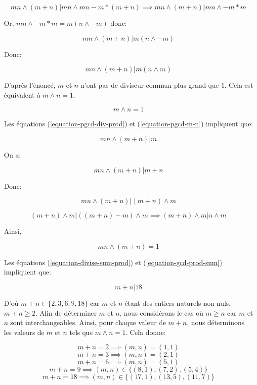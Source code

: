 \documentclass[12pt,a4paper,article]{memoir}
\begin{document}
\[mn \land (m + n)  | mn \land mn - m*(m + n) \implies mn \land (m + n)  | mn \land - m*m\]

Or, $mn \land - m*m = m(n \land - m)$ donc:

\[mn \land (m + n)  | m(n \land - m)\]

Donc:

\begin{equation}
mn \land (m + n)  | m(n \land m)
\label{equation-pgcd-div-prod}
\end{equation}

D'après l'énoncé, $m$ et $n$ n'ont pas de diviseur commun plus grand que 1. Cela est équivalent à $m \land n = 1$.

\begin{equation}
m \land n = 1
\label{equation-pgcd-m-n}
\end{equation}

Les équations (\ref{equation-pgcd-div-prod}) et (\ref{equation-pgcd-m-n}) impliquent que:

\begin{equation}
mn \land (m + n)  | m
\label{equation-divise-sum-prod-pgcd}
\end{equation}

On a:

\[mn \land (m + n)  | m + n \]

Donc:

\[mn \land (m + n)  | (m + n) \land m \]

\[(m + n) \land m | ((m + n) - m) \land m \implies (m + n) \land m | n \land m\]

Ainsi, 

\begin{equation}
mn \land (m + n)  = 1
\label{equation-gcd-prod-sum}
\end{equation}

Les équations (\ref{equation-divise-sum-prod}) et (\ref{equation-gcd-prod-sum}) impliquent que:

\begin{equation}
m+n | 18
\label{equation-sum-div-18}
\end{equation}

D'où $m + n \in \{2, 3, 6, 9, 18\}$ car $m$ et $n$ étant des entiers naturels non nuls, $m + n \geq 2$. Afin de déterminer $m$ et $n$, nous considérons le cas où $m \geq n$ car $m$ et $n$ sont interchangeables. Ainsi, pour chaque valeur de $m+n$, nous déterminons les valeurs de $m$ et $n$ tels que $m \land n = 1$.
Cela donne:

\[m + n = 2 \implies (m, n) = (1, 1)\]
\[m + n = 3 \implies (m, n) = (2, 1)\]
\[m + n = 6 \implies (m, n) = (5, 1)\]
\[m + n = 9 \implies (m, n) \in \{(8, 1), (7, 2), (5, 4)\}\]
\[m + n = 18 \implies (m, n) \in \{(17, 1), (13, 5), (11, 7)\}\]
\end{document}
